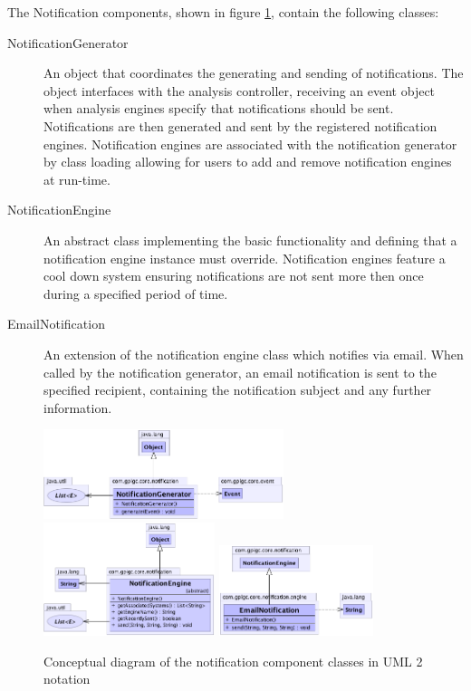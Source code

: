 \documentclass[10pt,a4paper]{article}
\begin{document}
The Notification components, shown in figure \ref{fig:notificationComponent}, 
contain the following classes:
\begin{description}
  \item [NotificationGenerator] An object that coordinates the generating and
    sending of notifications. The object interfaces with the analysis
    controller, receiving an event object when analysis engines specify that
    notifications should be sent. Notifications are then generated and sent by
    the registered notification engines. Notification engines are associated with
    the notification generator by class loading allowing for users to add and
    remove notification engines at run-time.

  \item [NotificationEngine] An abstract class implementing the basic
    functionality and defining that a notification engine instance must
    override. Notification engines feature a cool down system ensuring 
    notifications are not sent more then once during a specified period of 
    time.

  \item [EmailNotification] An extension of the notification engine
    class which notifies via email. When called by the notification
    generator, an email notification is sent to the specified recipient, 
    containing the notification subject and any further information.
\end{description}
 
\begin{figure}[h!]
  \centering
  \includegraphics[width= 7cm]{images/Notification/NotificationGenerator.png}
  \includegraphics[width= 5cm]{images/Notification/NotificationEngine.png}
  \includegraphics[width= 4.5cm]{images/Notification/EmailNotification.png}
  \caption{Conceptual diagram of the notification component classes in
UML 2 notation}
  \label{fig:notificationComponent}
\end{figure}
\end{document}
